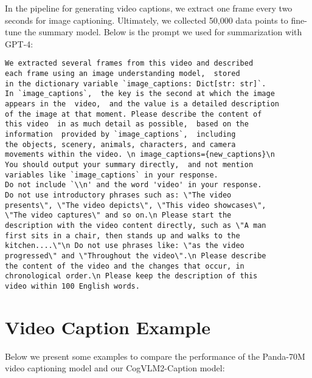 \documentclass{article} \usepackage{iclr2024_conference,times}
\begin{document}
{In the pipeline for generating video captions, we extract one frame every two seconds for image captioning. Ultimately, we collected 50,000 data points to fine-tune the summary model. Below is the prompt we used for summarization with GPT-4:
\begin{promptbox}
\noindent
\begin{verbatim}
We extracted several frames from this video and described 
each frame using an image understanding model,  stored 
in the dictionary variable `image_captions: Dict[str: str]`.  
In `image_captions`,  the key is the second at which the image 
appears in the  video,  and the value is a detailed description 
of the image at that moment. Please describe the content of 
this video  in as much detail as possible,  based on the 
information  provided by `image_captions`,  including 
the objects, scenery, animals, characters, and camera 
movements within the video. \n image_captions={new_captions}\n 
You should output your summary directly,  and not mention
variables like `image_captions` in your response. 
Do not include `\\n' and the word 'video' in your response.  
Do not use introductory phrases such as: \"The video 
presents\", \"The video depicts\", \"This video showcases\", 
\"The video captures\" and so on.\n Please start the 
description with the video content directly, such as \"A man
first sits in a chair, then stands up and walks to the 
kitchen....\"\n Do not use phrases like: \"as the video 
progressed\" and \"Throughout the video\".\n Please describe 
the content of the video and the changes that occur, in 
chronological order.\n Please keep the description of this 
video within 100 English words.
\end{verbatim}
\end{promptbox}

 \section{Video Caption Example}
\label{ap:video_caption_example}
Below we present some examples to compare the performance of the Panda-70M video captioning model and our CogVLM2-Caption model:








}
\end{document}
